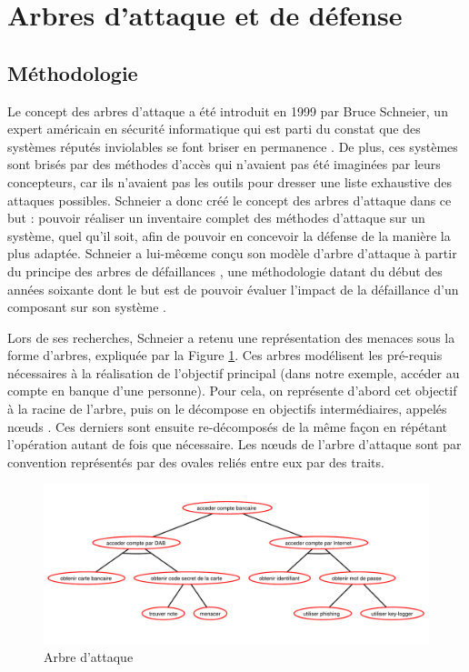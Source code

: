 \section{Arbres d'attaque et de défense}
	\label{sec:etat_art}

    \subsection{Méthodologie}
        Le concept des arbres d'attaque a été introduit en 1999 par Bruce Schneier, un expert américain en sécurité informatique qui est parti du constat que des systèmes réputés \og inviolables \fg se font briser en permanence \cite{doc_Schneier}. De plus, ces systèmes sont brisés par des méthodes d'accès qui n'avaient pas été imaginées par leurs concepteurs, car ils n'avaient pas les outils pour dresser une liste exhaustive des attaques possibles. Schneier a donc créé le concept des arbres d'attaque dans ce but : pouvoir réaliser un inventaire complet des méthodes d'attaque sur un système, quel qu'il soit, afin de pouvoir en concevoir la défense de la manière la plus adaptée. Schneier a lui-mêœme conçu son modèle d'arbre d'attaque à partir du principe des \og arbres de défaillances \fg, une méthodologie datant du début des années soixante dont le but est de pouvoir évaluer l'impact de la défaillance d'un composant sur son système \cite{defaillanceTree}.

        Lors de ses recherches, Schneier a retenu une représentation des menaces sous la forme d'arbres, expliquée par la Figure \ref{fig:arbre_exemple_1}. Ces arbres modélisent les pré-requis nécessaires à la réalisation de l'objectif principal (dans notre exemple, accéder au compte en banque d'une personne). Pour cela, on représente d'abord cet objectif à la racine de l'arbre, puis on le décompose en objectifs intermédiaires, appelés \og nœuds \fg. Ces derniers sont ensuite re-décomposés de la même façon en répétant l'opération autant de fois que nécessaire. Les nœuds de l'arbre d'attaque sont par convention représentés par des ovales reliés entre eux par des traits.

        \begin{figure}[h]
            \centering
            \includegraphics[width=1\textwidth]{figure/exemple1_rapport.pdf}
            \caption{Arbre d'attaque}
            \label{fig:arbre_exemple_1}
        \end{figure}

